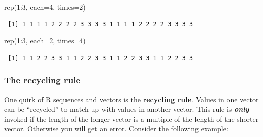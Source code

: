 \documentclass[
  13,
  letterpaper,
]{report}
\newenvironment{Shaded}{\begin{snugshade}}{\end{snugshade}}
\newcommand{\AttributeTok}[1]{\textcolor[rgb]{0.40,0.45,0.13}{#1}}
\newcommand{\CommentTok}[1]{\textcolor[rgb]{0.37,0.37,0.37}{#1}}
\newcommand{\DecValTok}[1]{\textcolor[rgb]{0.68,0.00,0.00}{#1}}
\newcommand{\FunctionTok}[1]{\textcolor[rgb]{0.28,0.35,0.67}{#1}}
\newcommand{\NormalTok}[1]{\textcolor[rgb]{0.00,0.23,0.31}{#1}}
\newcommand{\OtherTok}[1]{\textcolor[rgb]{0.00,0.23,0.31}{#1}}
\newcommand{\SpecialCharTok}[1]{\textcolor[rgb]{0.37,0.37,0.37}{#1}}
\begin{document}
\begin{Shaded}
\begin{Highlighting}[]
\FunctionTok{rep}\NormalTok{(}\DecValTok{1}\SpecialCharTok{:}\DecValTok{3}\NormalTok{, }\AttributeTok{each=}\DecValTok{4}\NormalTok{, }\AttributeTok{times=}\DecValTok{2}\NormalTok{)}
\end{Highlighting}
\end{Shaded}

\begin{verbatim}
 [1] 1 1 1 1 2 2 2 2 3 3 3 3 1 1 1 1 2 2 2 2 3 3 3 3
\end{verbatim}

\begin{Shaded}
\begin{Highlighting}[]
\FunctionTok{rep}\NormalTok{(}\DecValTok{1}\SpecialCharTok{:}\DecValTok{3}\NormalTok{, }\AttributeTok{each=}\DecValTok{2}\NormalTok{, }\AttributeTok{times=}\DecValTok{4}\NormalTok{)}
\end{Highlighting}
\end{Shaded}

\begin{verbatim}
 [1] 1 1 2 2 3 3 1 1 2 2 3 3 1 1 2 2 3 3 1 1 2 2 3 3
\end{verbatim}

\subsubsection{The recycling rule}\label{sec-manip-make-seq-rec}

One quirk of R sequences and vectors is the \textbf{recycling rule}.
Values in one vector can be ``recycled'' to match up with values in
another vector. This rule is \textbf{\emph{only}} invoked if the length
of the longer vector is a multiple of the length of the shorter vector.
Otherwise you will get an error. Consider the following example:

\begin{Shaded}
\end{Shaded}
\end{document}
